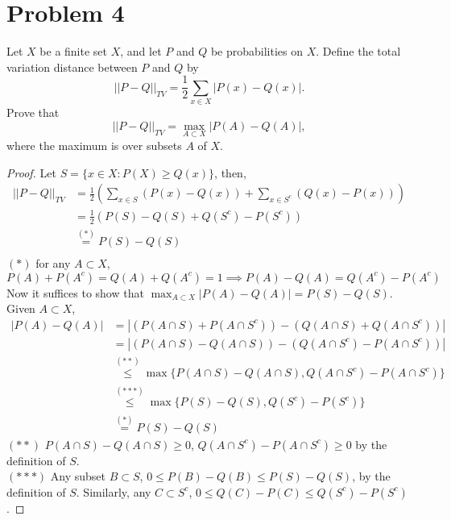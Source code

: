 \documentclass{article}
\begin{document}
\section*{Problem 4}
Let $X$ be a finite set $X$, and let $P$ and $Q$ be probabilities on $X$. Define the total variation distance between $P$ and $Q$ by 
\begin{equation*}
    ||P-Q||_{TV} = \frac{1}{2}\sum_{x \in X} |P(x)-Q(x)|.
\end{equation*}
Prove that
\begin{equation*}
    ||P-Q||_{TV} = \max_{A \subset X}|P(A)-Q(A)|,
\end{equation*}
where the maximum is over subsets $A$ of $X$.
\color{blue}
\begin{proof}
    Let $S=\{x\in X: P(X)\geq Q(x)\}$, then, 
    \begin{equation*}
        \begin{split}
            ||P-Q||_{TV} &= \frac{1}{2}\left(\sum_{x\in S}(P(x)-Q(x))+\sum_{x\in S^c}(Q(x)-P(x))\right)\\
                &=\frac{1}{2}\left(P(S)-Q(S)+Q(S^c)-P(S^c)\right)\\
                &\stackrel{(*)}{=}P(S)-Q(S)\\
        \end{split}
    \end{equation*}
    $(*)$ for any $A\subset X$,
    $$P(A)+P(A^c)=Q(A)+Q(A^c) = 1 \implies P(A)-Q(A)=Q(A^c)-P(A^c)$$
    Now it suffices to show that $\max_{A \subset X}|P(A)-Q(A)| = P(S)-Q(S)$. Given $A \subset X$,
    \begin{equation*}
        \begin{split}
            |P(A)-Q(A)| &= |(P(A\cap S)+ P(A \cap S^c)) - (Q(A \cap S)+Q(A \cap S^c))|\\
            &= |(P(A\cap S)-Q(A \cap S))- (Q(A \cap S^c)- P(A \cap S^c))|\\
            &\stackrel{(**)}{\leq} \max\{P(A\cap S)-Q(A \cap S),Q(A \cap S^c)- P(A \cap S^c)\}\\
            &\stackrel{(***)}{\leq} \max\{P(S)-Q(S),Q(S^c)-P(S^c)\}\\
            &\stackrel{(*)}{=}P(S)-Q(S)
        \end{split}
    \end{equation*}
    $(**)$ $P(A\cap S)-Q(A \cap S)\geq 0$, $Q(A \cap S^c)- P(A \cap S^c)\geq0$ by the definition of $S$.\\
    $(***)$ Any subset $B\subset S$, $0\leq P(B)-Q(B)\leq P(S)-Q(S)$, by the definition of $S$. Similarly, any $C \subset S^c$, $0\leq Q(C)-P(C) \leq Q(S^c)-P(S^c)$.
\end{proof}
\end{document}
